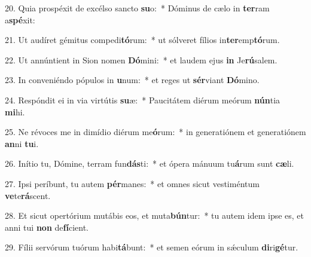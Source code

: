 20. Quia prospéxit de excélso sancto \textbf{su}o:~*  Dóminus de cælo in \textbf{ter}ram a\textbf{spé}xit:\

21. Ut audíret gémitus compedi\textbf{tó}rum:~*  ut sólveret fílios in\textbf{ter}emp\textbf{tó}rum.\

22. Ut annúntient in Sion nomen \textbf{Dó}mini:~*  et laudem ejus \textbf{in} Je\textbf{rú}salem.\

23. In conveniéndo pópulos in \textbf{u}num:~*  et reges ut \textbf{sér}viant \textbf{Dó}mino.\

24. Respóndit ei in via virtútis \textbf{su}æ:~*  Paucitátem diérum meórum \textbf{nún}tia \textbf{mi}hi.\

25. Ne révoces me in dimídio diérum me\textbf{ó}rum:~*  in generatiónem et generatiónem \textbf{an}ni \textbf{tu}i.\

26. Inítio tu, Dómine, terram fun\textbf{dás}ti:~*  et ópera mánuum tu\textbf{á}rum sunt \textbf{cæ}li.\

27. Ipsi períbunt, tu autem \textbf{pér}manes:~*  et omnes sicut vestiméntum \textbf{ve}te\textbf{rá}scent.\

28. Et sicut opertórium mutábis eos, et muta\textbf{bún}tur:~*  tu autem idem ipse es, et anni tui \textbf{non} de\textbf{fí}cient.\

29. Fílii servórum tuórum habi\textbf{tá}bunt:~*  et semen eórum in sǽculum \textbf{di}ri\textbf{gé}tur.\

